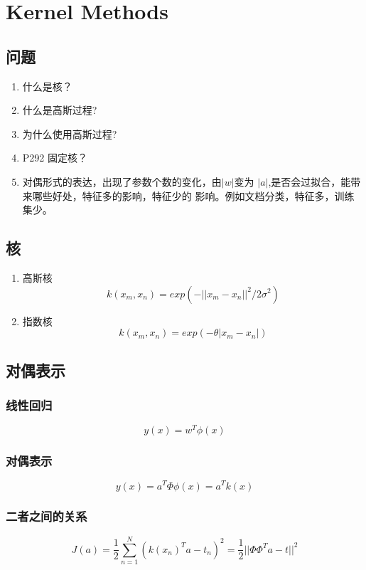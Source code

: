 \chapter{Kernel Methods}
\section{问题}
\begin{enumerate}
\item 什么是核？
\item 什么是高斯过程?
\item 为什么使用高斯过程?
\item P292 固定核？
\item 对偶形式的表达，出现了参数个数的变化，由$|w|$变为
$|a|$,是否会过拟合，能带来哪些好处，特征多的影响，特征少的
影响。例如文档分类，特征多，训练集少。
\end{enumerate}
\section{核}
\begin{enumerate}
\item 高斯核
\begin{equation}
k(x_m, x_n) = exp(-||x_m - x_n||^2/2\sigma^2)
\end{equation}
\item 指数核
\begin{equation}
k(x_m, x_n) = exp(-\theta|x_m - x_n|)
\end{equation}
\end{enumerate}

\section{对偶表示}
\subsection{线性回归}
\begin{equation}
y(x) = w^T\phi(x)
\end{equation}
\subsection{对偶表示}
\begin{equation}
y(x) = a^T\Phi\phi(x) = a^Tk(x)
\end{equation}
\subsection{二者之间的关系}
\begin{equation}
J(a) = \frac{1}{2}\sum_{n=1}^N(k(x_n)^Ta - t_n)^2
= \frac{1}{2}||\Phi\Phi^Ta - t||^2
\end{equation}


